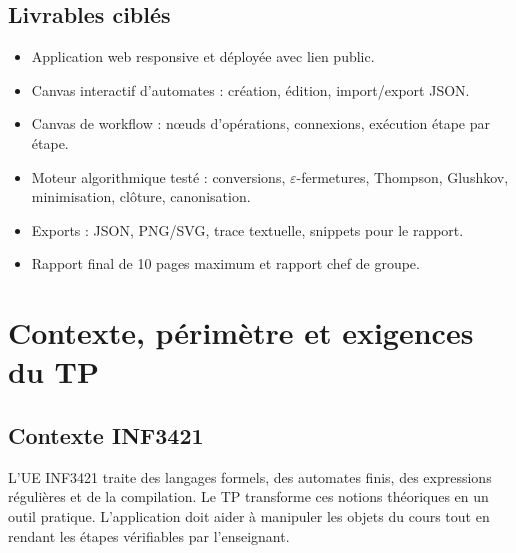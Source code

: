 \documentclass[11pt,a4paper]{report}
\newcommand{\eps}{\ensuremath{\varepsilon}}
\begin{document}
\section*{Livrables ciblés}
\begin{itemize}
  \item Application web responsive et déployée avec lien public.
  \item Canvas interactif d'automates : création, édition, import/export JSON.
  \item Canvas de workflow : nœuds d'opérations, connexions, exécution étape par étape.
  \item Moteur algorithmique testé : conversions, \eps-fermetures, Thompson, Glushkov, minimisation, clôture, canonisation.
  \item Exports : JSON, PNG/SVG, trace textuelle, snippets pour le rapport.
  \item Rapport final de 10 pages maximum et rapport chef de groupe.
\end{itemize}

\chapter{Contexte, périmètre et exigences du TP}

\section{Contexte INF3421}
L'UE INF3421 traite des langages formels, des automates finis, des expressions régulières et de la compilation. Le TP transforme ces notions théoriques en un outil pratique. L'application doit aider à manipuler les objets du cours tout en rendant les étapes vérifiables par l'enseignant.
\end{document}
